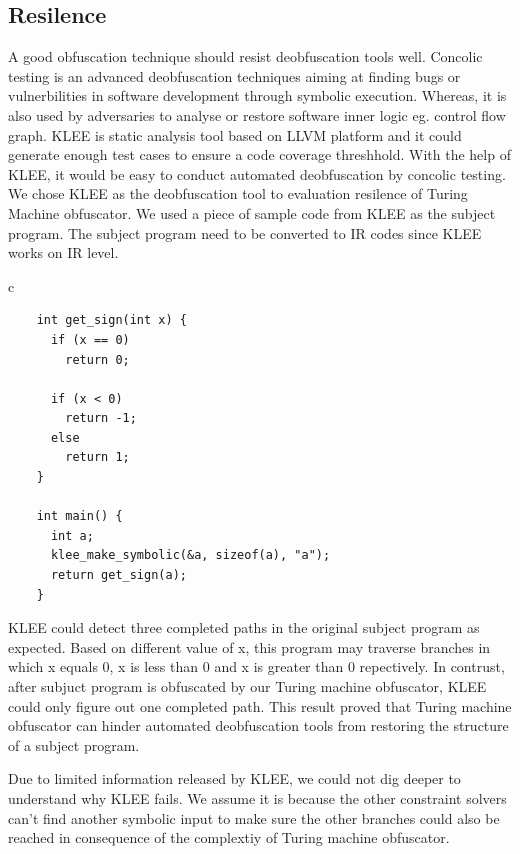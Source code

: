 \documentclass[lnicst]{svmultln}
\begin{document}
\subsection{Resilence}
A good obfuscation technique should resist deobfuscation tools well. Concolic testing is an advanced deobfuscation techniques aiming at finding bugs or vulnerbilities in software development through symbolic execution. Whereas, it is also used by adversaries to analyse or restore software inner logic eg. control flow graph. KLEE\cite{klee} is static analysis tool based on LLVM platform and it could generate enough test cases to ensure a code coverage threshhold. With the help of KLEE, it would be easy to conduct  automated deobfuscation by concolic testing. We chose KLEE as the deobfuscation tool to evaluation resilence of Turing Machine obfuscator.
We used a piece of sample code from KLEE\cite{klee} as the subject program. The subject program need to be converted to IR codes since KLEE works on IR level.
\begin{center}
\begin{tabular}{c}
\begin{lstlisting}
    int get_sign(int x) {
      if (x == 0)
        return 0; 

      if (x < 0)
        return -1;
      else 
        return 1;
    }

    int main() {
      int a;
      klee_make_symbolic(&a, sizeof(a), "a");
      return get_sign(a);
    }
\end{lstlisting}
\end{tabular}
\end{center}
KLEE could detect three completed paths in the original subject program as expected. Based on different value of x, this program may traverse branches in which x equals 0, x is less than 0 and x is greater than 0 repectively. In contrust, after subjuct program is obfuscated by our Turing machine obfuscator, KLEE could only figure out one completed path. This result proved that Turing machine obfuscator can hinder  automated deobfuscation tools from restoring the structure of a subject program.

Due to limited information released by KLEE, we could not dig deeper to understand why KLEE fails. We assume it is because the other constraint solvers can't find another symbolic input to make sure the other branches could also be reached in consequence of the complextiy of Turing machine obfuscator.
\end{document}
